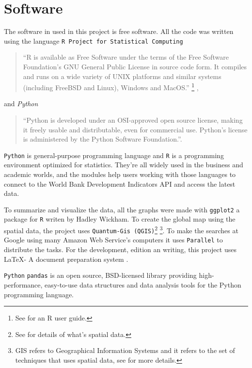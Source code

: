 \chapter{Software}
\label{chap_software}


\noindent The software in used in this project is free software. All the code was written using the  language \texttt{R Project for Statistical Computing}\begin{quote}``R is available as Free Software under the terms of the Free Software Foundation’s GNU General Public License in source code form. It compiles and runs on a wide variety of UNIX platforms and similar systems (including FreeBSD and Linux), Windows and MacOS.'' \footnote{See \cite{R:Bloomfield:2014} for an R user guide.} \cite{r_pagina},\end{quote}
and \textit{Python}
\begin{quote}``Python is developed under an OSI-approved open source license, making it freely usable and distributable, even for commercial use. Python's license is administered by the Python Software Foundation.''\cite{python_about}.\end{quote}

\texttt{Python} is general-purpose programming language and \texttt{R} is  a programming environment optimized for statistics. They're all widely used in the business and academic worlds, and the modules help users working with those languages to connect to the World Bank Development Indicators API and access the latest data.

To summarize and visualize the data, all the graphs were made with \texttt{ggplot2} \parencite{wickham_ggplot} a package for \texttt{R} writen by Hadley Wickham. To create the global map using the spatial data, the project uses \texttt{Quantum-Gis (QGIS)}\footnote{See \cite{clifford1981} for details of what's spatial data.} \footnote{GIS refers to Geographical Information Systems and it refers to the set of techniques that uses spatial data, see \cite{GIS05}  for more details.}. To make the searches at Google using many Amazon Web Service's computers it uses \texttt{Parallel} \parencite{Tange2011a} to distribute the tasks. For the development, edition an writing, this project uses \LaTeX - A document preparation system \cite{latex}.

\texttt{Python} \texttt{pandas} is an open source, BSD-licensed library providing high-performance, easy-to-use data structures and data analysis tools for the Python programming language.

